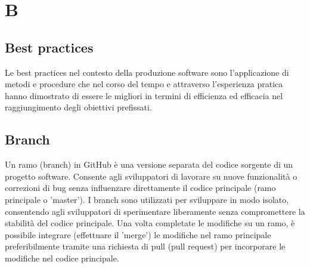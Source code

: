 \section*{B} 
\subsection*{Best practices} 
Le best practices nel contesto della produzione software sono l'applicazione di metodi e procedure che nel corso del tempo e attraverso l'esperienza pratica hanno dimostrato di essere le migliori in termini di efficienza ed efficacia nel raggiungimento degli obiettivi prefissati.
\subsection*{Branch} 
Un ramo (branch) in GitHub è una versione separata del codice sorgente di un progetto software. Consente agli sviluppatori di lavorare su nuove funzionalità o correzioni di bug senza influenzare direttamente il codice principale (ramo principale o 'master'). I branch sono utilizzati per sviluppare in modo isolato, consentendo agli sviluppatori di sperimentare liberamente senza compromettere la stabilità del codice principale. Una volta completate le modifiche su un ramo, è possibile integrare (effettuare il 'merge') le modifiche nel ramo principale preferibilmente tramite una richiesta di pull (pull request) per incorporare le modifiche nel codice principale.
